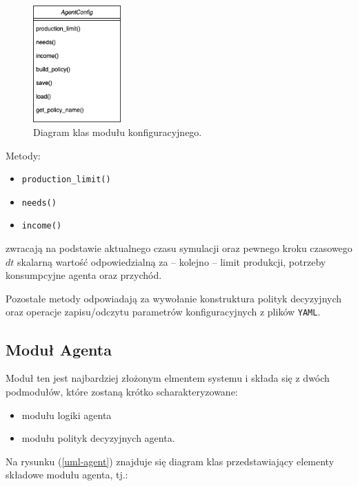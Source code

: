 \documentclass{article}
\begin{document}
\begin{figure}[H]
	\centering
	\includegraphics[width=0.3\textwidth, height=0.3\textheight]{./png/config-uml.png}
	\caption{Diagram klas modułu konfiguracyjnego.}
	\label{uml-config}
\end{figure}

Metody:
\begin{itemize}
	\item \texttt{production\_limit()}
	\item \texttt{needs()}
	\item \texttt{income()}
\end{itemize}

zwracają na podstawie aktualnego czasu symulacji oraz pewnego kroku czasowego $dt$ skalarną wartość odpowiedzialną za -- kolejno -- limit produkcji, potrzeby konsumpcyjne agenta
oraz przychód.

Pozostałe metody odpowiadają za wywołanie konstruktura polityk decyzyjnych oraz operacje zapisu/odczytu parametrów konfiguracyjnych z plików \texttt{YAML}.


\subsection{Moduł Agenta}

Moduł ten jest najbardziej złożonym elmentem systemu i składa się z dwóch podmodułów, które zostaną krótko scharakteryzowane:

\begin{itemize}
	\item modułu logiki agenta
	\item modułu polityk decyzyjnych agenta.
\end{itemize}


Na rysunku (\ref{uml-agent}) znajduje się diagram klas przedstawiający elementy składowe modułu agenta, tj.:
\end{document}
